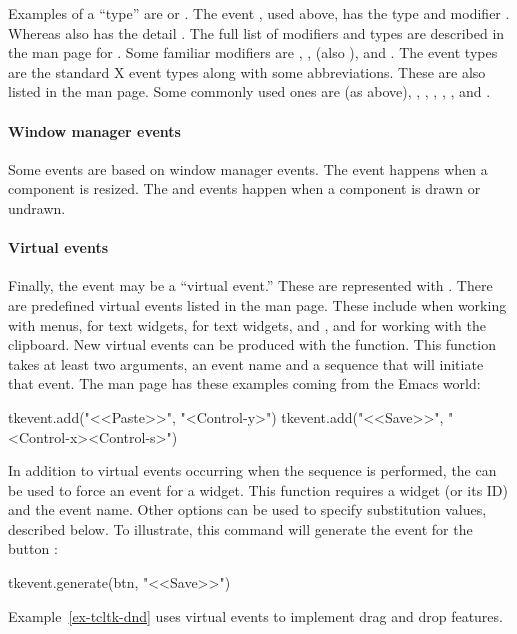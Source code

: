 Examples of a ``type'' are  or
. The event , used
above, has the type  and modifier . Whereas
 also has the detail . The full
list of modifiers and types are described in the man page for
. Some familiar modifiers are , ,
 (also ),  and . The
event types are the standard X event types along with some
abbreviations. These are also listed in the  man page. Some
commonly used ones are  (as above), ,
, , ,
, and .

\paragraph{Window manager events}
Some events are based on window manager events. The 
event happens when a component is resized. The  and
 events happen when a component is drawn or undrawn.

\paragraph{Virtual events}
Finally, the event may be a ``virtual event.'' These are represented
with . There are predefined virtual
events listed in the  man page. These include
 when working with menus,
 for text widgets,
 for text widgets, and
,  and
 for working with the clipboard. New
virtual events can be produced with the 
function. This function takes at least two arguments, an event name and a
sequence that will initiate that event. The  man page has
these examples coming from the Emacs world:
\begin{Schunk}
\begin{Sinput}
  tkevent.add("<<Paste>>", "<Control-y>")
  tkevent.add("<<Save>>", "<Control-x><Control-s>")
\end{Sinput}
\end{Schunk}
%
In addition to virtual events occurring when the sequence is performed,
the  can be used to force an event for a
widget. This function requires a widget (or its ID) and the event
name. Other options can be used to specify substitution values,
described below. To illustrate, this command will generate the
 event for the button :
\begin{Schunk}
\begin{Sinput}
 tkevent.generate(btn, "<<Save>>")
\end{Sinput}
\end{Schunk}
%
Example~\ref{ex-tcltk-dnd} uses virtual events to implement drag and
drop features.


